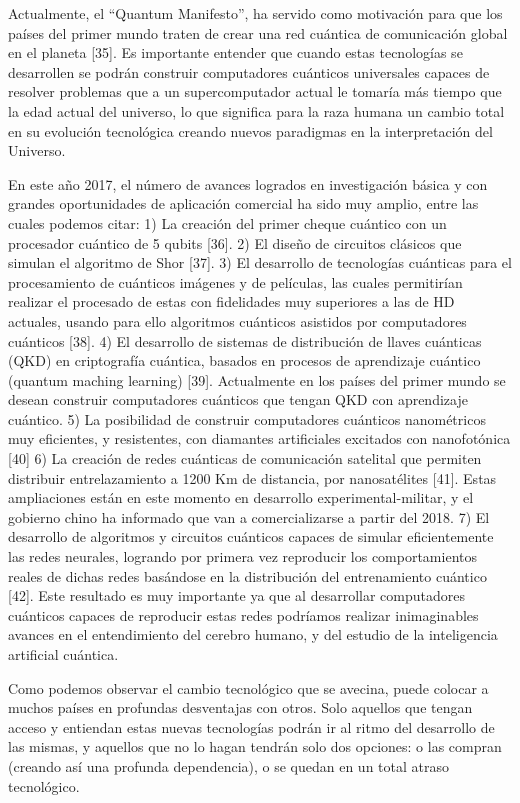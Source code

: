 Actualmente, el “Quantum Manifesto”, ha servido como motivación para que los países del primer mundo traten de crear una red cuántica de comunicación global en el planeta [35]. Es importante entender que cuando estas tecnologías se desarrollen se podrán construir computadores cuánticos universales capaces de resolver problemas que a un supercomputador actual le tomaría más tiempo que la edad actual del universo, lo que significa para la raza humana un cambio total en su evolución tecnológica creando nuevos paradigmas en la interpretación del Universo.

En este año 2017, el número de avances logrados en investigación básica y con grandes oportunidades de aplicación comercial ha sido muy amplio, entre las cuales podemos citar:
1) La creación del primer cheque cuántico con un procesador cuántico de 5 qubits [36].
2) El diseño de circuitos clásicos que simulan el algoritmo de Shor [37].
3) El desarrollo de tecnologías cuánticas para el procesamiento de cuánticos imágenes y de películas, las cuales
permitirían realizar el procesado de estas con fidelidades muy superiores a las de HD actuales, usando para ello
algoritmos cuánticos asistidos por computadores cuánticos [38].
4) El desarrollo de sistemas de distribución de llaves cuánticas (QKD) en criptografía cuántica, basados en procesos
de aprendizaje cuántico (quantum maching learning) [39]. Actualmente en los países del primer mundo se desean
construir computadores cuánticos que tengan QKD con aprendizaje cuántico.
5) La posibilidad de construir computadores cuánticos nanométricos muy eficientes, y resistentes, con diamantes artificiales excitados
con nanofotónica [40]
6) La creación de redes cuánticas de comunicación satelital que permiten distribuir entrelazamiento a 1200 Km de
distancia, por nanosatélites [41]. Estas ampliaciones están en este momento en desarrollo experimental-militar, y el
gobierno chino ha informado que van a comercializarse a partir del 2018.
7) El desarrollo de algoritmos y circuitos cuánticos capaces de simular eficientemente las redes neurales, logrando
por primera vez reproducir los comportamientos reales de dichas redes basándose en la distribución del
entrenamiento cuántico [42]. Este resultado es muy importante ya que al desarrollar computadores cuánticos capaces de reproducir estas
redes podríamos realizar inimaginables avances en el entendimiento del cerebro humano, y del estudio de la
inteligencia artificial cuántica.

Como podemos observar el cambio tecnológico que se avecina, puede colocar a muchos países en profundas desventajas con otros. Solo aquellos que tengan acceso y entiendan estas nuevas tecnologías podrán ir al ritmo del desarrollo de las mismas, y aquellos que no lo hagan tendrán solo dos opciones: o las compran (creando así una profunda dependencia), o se quedan en un total atraso tecnológico.

